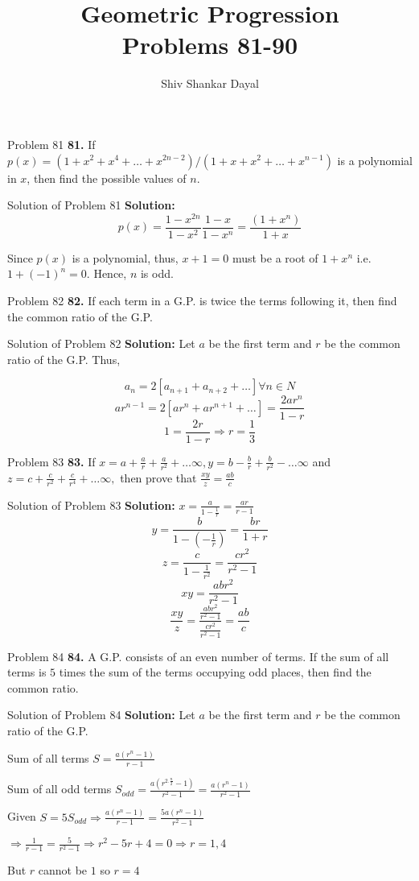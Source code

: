 \documentclass[aspectratio=1610,8pt]{beamer}
\title{Geometric Progression\\Problems 81-90}
\author[Shiv Shankar Dayal]{Shiv Shankar Dayal}
\begin{document}
\begin{frame}
  \titlepage
\end{frame}
\begin{frame}{Problem 81}
  \textbf{81.} If $p(x) = (1 + x^2 + x^4 + \ldots + x^{2n - 2})/(1 + x + x^2 + \ldots + x^{n - 1})$ is a polynomial in $x$, then
  find the possible values of $n.$
\end{frame}
\begin{frame}{Solution of Problem 81}
  \textbf{Solution:} $$p(x) = \frac{1 - x^{2n}}{1 - x^2}\frac{1 - x}{1 - x^n} = \frac{(1 + x^n)}{1 + x}$$

  Since $p(x)$ is a polynomial, thus, $x + 1 = 0$ must be a root of $1 + x^n$ i.e. $1 + (-1)^n = 0.$ Hence, $n$ is odd.
\end{frame}
\begin{frame}{Problem 82}
  \textbf{82.} If each term in a G.P. is twice the terms following it, then find the common ratio of the G.P.
\end{frame}
\begin{frame}{Solution of Problem 82}
  \textbf{Solution:} Let $a$ be the first term and $r$ be the common ratio of the G.P. Thus,

  $$a_n = 2[a_{n + 1} + a_{n + 2} + \ldots ]\forall n\in N$$
  $$ar^{n - 1} = 2[ar^n + ar^{n + 1} + \ldots] = \frac{2ar^n}{1 - r}$$
  $$1 = \frac{2r}{1 - r}\Rightarrow r = \frac{1}{3}$$
\end{frame}
\begin{frame}{Problem 83}
  \textbf{83.} If $x = a + \frac{a}{r} + \frac{a}{r^2} + \ldots \infty, y = b - \frac{b}{r} + \frac{b}{r^2} - \ldots \infty$ and $z
  = c + \frac{c}{r^2} + \frac{c}{r^4} + \ldots \infty,$ then prove that $\frac{xy}{z} = \frac{ab}{c}$
\end{frame}
\begin{frame}{Solution of Problem 83}
  \textbf{Solution:} $x = \frac{a}{1 - \frac{1}{r}} = \frac{ar}{r - 1}$
  $$y = \frac{b}{1 - \left(-\frac{1}{r}\right)} = \frac{br}{1 + r}$$
  $$z = \frac{c}{1 - \frac{1}{r^2}} = \frac{cr^2}{r^2 - 1}$$
  $$xy = \frac{abr^2}{r^2 - 1}$$
  $$\frac{xy}{z} = \frac{\frac{abr^2}{r^2 - 1}}{\frac{cr^2}{r^2 - 1}} = \frac{ab}{c}$$
\end{frame}
\begin{frame}{Problem 84}
  \textbf{84.} A G.P. consists of an even number of terms. If the sum of all terms is $5$ times the sum of the terms occupying odd
  places, then find the common ratio.
\end{frame}
\begin{frame}{Solution of Problem 84}
  \textbf{Solution:} Let $a$ be the first term and $r$ be the common ratio of the G.P.

  Sum of all terms $S = \frac{a(r^n - 1)}{r - 1}$

  Sum of all odd terms $S_{odd} = \frac{a(r^{2.\frac{n}{2}} - 1)}{r^2 - 1} = \frac{a(r^n - 1)}{r^2 - 1}$

  Given $S = 5S_{odd}\Rightarrow \frac{a(r^n - 1)}{r - 1} = \frac{5a(r^n - 1)}{r^2 - 1}$

  $\Rightarrow \frac{1}{r - 1} = \frac{5}{r^2 - 1}\Rightarrow r^2 - 5r + 4 = 0\Rightarrow r = 1, 4$

  But $r$ cannot be $1$ so $r = 4$
\end{frame}
\end{document}
